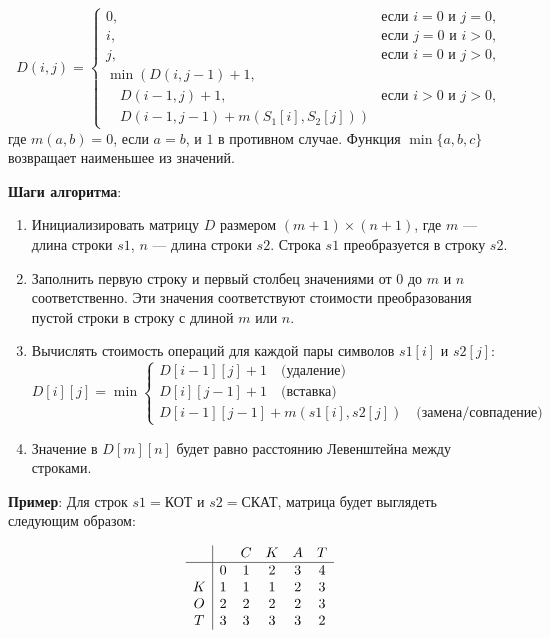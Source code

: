 \begin{equation}
D(i, j) =
\begin{cases}
0, & \text{если } i = 0 \text{ и } j = 0, \\
i, & \text{если } j = 0 \text{ и } i > 0, \\
j, & \text{если } i = 0 \text{ и } j > 0, \\
\min \left( 
  D(i, j - 1) + 1, \right. \\
  \quad D(i - 1, j) + 1, & \text{если } i > 0 \text{ и } j > 0, \\
  \quad D(i - 1, j - 1) + m(S_1[i], S_2[j])
  \left. \right)
\end{cases}
\end{equation}
где \( m(a, b) = 0 \), если \( a = b \), и \( 1 \) в противном случае. Функция \( \min\{a, b, c\} \) возвращает наименьшее из значений.


\vspace{0.5cm}
\textbf{Шаги алгоритма}:
\begin{enumerate}
    \item Инициализировать матрицу $D$ размером $(m+1) \times (n+1)$, где $m$ — длина строки $s1$, $n$ — длина строки $s2$. Строка $s1$ преобразуется в строку $s2$.
    \item Заполнить первую строку и первый столбец значениями от 0 до $m$ и $n$ соответственно. Эти значения соответствуют стоимости преобразования пустой строки в строку с длиной $m$ или $n$.
    \item Вычислять стоимость операций для каждой пары символов $s1[i]$ и $s2[j]$:
    \begin{equation}
    D[i][j] = \min \left\{
    \begin{array}{l}
        D[i-1][j] + 1 \quad  \text{(удаление)} \\
        D[i][j-1] + 1 \quad  \text{(вставка)} \\
        D[i-1][j-1] + m(s1[i], s2[j]) \quad  \text{(замена/совпадение)}
    \end{array}
    \right.
	\end{equation}


    \item Значение в $D[m][n]$ будет равно расстоянию Левенштейна между строками.
\end{enumerate}

\textbf{Пример}:
Для строк $s1 = \texttt{КОТ}$ и $s2 = \texttt{СКАТ}$, матрица будет выглядеть следующим образом:

\begin{equation}
\begin{array}{c|cccccccc}
  &   & C & K & A & T \\
\hline
  & 0 & 1 & 2 & 3 & 4 \\
K & 1 & 1 & 1 & 2 & 3 \\
O & 2 & 2 & 2 & 2 & 3 \\
T & 3 & 3 & 3 & 3 & 2 \\
\end{array}
\end{equation}



